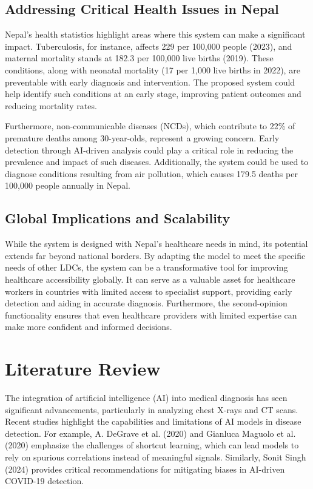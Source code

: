 \documentclass[12pt,a4paper]{report}
\begin{document}
\section{Addressing Critical Health Issues in Nepal}
Nepal's health statistics highlight areas where this system can make a significant impact. Tuberculosis, for instance, affects 229 per 100,000 people (2023), and maternal mortality stands at 182.3 per 100,000 live births (2019). These conditions, along with neonatal mortality (17 per 1,000 live births in 2022), are preventable with early diagnosis and intervention. The proposed system could help identify such conditions at an early stage, improving patient outcomes and reducing mortality rates\cite{Nepal_profile}.

Furthermore, non-communicable diseases (NCDs), which contribute to 22\% of premature deaths among 30-year-olds, represent a growing concern. Early detection through AI-driven analysis could play a critical role in reducing the prevalence and impact of such diseases. Additionally, the system could be used to diagnose conditions resulting from air pollution, which causes 179.5 deaths per 100,000 people annually in Nepal\cite{Nepal_profile}.

\section{Global Implications and Scalability}
While the system is designed with Nepal's healthcare needs in mind, its potential extends far beyond national borders. By adapting the model to meet the specific needs of other LDCs, the system can be a transformative tool for improving healthcare accessibility globally. It can serve as a valuable asset for healthcare workers in countries with limited access to specialist support, providing early detection and aiding in accurate diagnosis. Furthermore, the second-opinion functionality ensures that even healthcare providers with limited expertise can make more confident and informed decisions.

\pagebreak
\chapter{Literature Review}

The integration of artificial intelligence (AI) into medical diagnosis has seen significant advancements, particularly in analyzing chest X-rays and CT scans. Recent studies highlight the capabilities and limitations of AI models in disease detection. For example, A. DeGrave et al. (2020) \cite{DeGrave_2020} and Gianluca Maguolo et al. (2020)\cite{Maguolo_2020} emphasize the challenges of shortcut learning, which can lead models to rely on spurious correlations instead of meaningful signals. Similarly, Sonit Singh (2024)\cite{Singh_2024} provides critical recommendations for mitigating biases in AI-driven COVID-19 detection.
\end{document}
